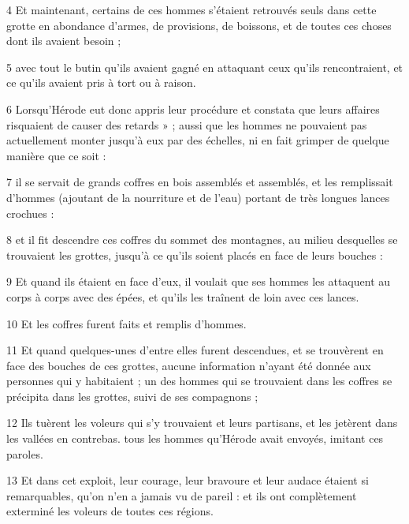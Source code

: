 \par 4 Et maintenant, certains de ces hommes s'étaient retrouvés seuls dans cette grotte en abondance d'armes, de provisions, de boissons, et de toutes ces choses dont ils avaient besoin ;

\par 5 avec tout le butin qu'ils avaient gagné en attaquant ceux qu'ils rencontraient, et ce qu'ils avaient pris à tort ou à raison.

\par 6 Lorsqu'Hérode eut donc appris leur procédure et constata que leurs affaires risquaient de causer des retards » ; aussi que les hommes ne pouvaient pas actuellement monter jusqu'à eux par des échelles, ni en fait grimper de quelque manière que ce soit :

\par 7 il se servait de grands coffres en bois assemblés et assemblés, et les remplissait d'hommes (ajoutant de la nourriture et de l'eau) portant de très longues lances crochues :

\par 8 et il fit descendre ces coffres du sommet des montagnes, au milieu desquelles se trouvaient les grottes, jusqu'à ce qu'ils soient placés en face de leurs bouches :

\par 9 Et quand ils étaient en face d'eux, il voulait que ses hommes les attaquent au corps à corps avec des épées, et qu'ils les traînent de loin avec ces lances.

\par 10 Et les coffres furent faits et remplis d'hommes.

\par 11 Et quand quelques-unes d'entre elles furent descendues, et se trouvèrent en face des bouches de ces grottes, aucune information n'ayant été donnée aux personnes qui y habitaient ; un des hommes qui se trouvaient dans les coffres se précipita dans les grottes, suivi de ses compagnons ;

\par 12 Ils tuèrent les voleurs qui s'y trouvaient et leurs partisans, et les jetèrent dans les vallées en contrebas. tous les hommes qu'Hérode avait envoyés, imitant ces paroles.

\par 13 Et dans cet exploit, leur courage, leur bravoure et leur audace étaient si remarquables, qu'on n'en a jamais vu de pareil : et ils ont complètement exterminé les voleurs de toutes ces régions.

